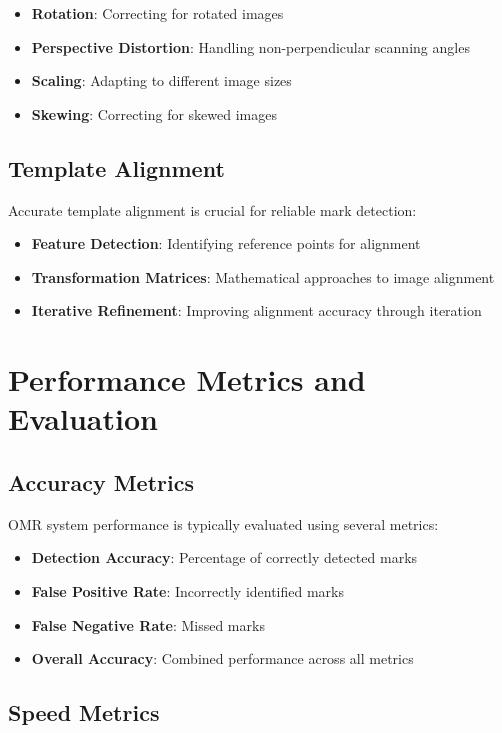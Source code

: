 \begin{itemize}
\item \textbf{Rotation}: Correcting for rotated images
\item \textbf{Perspective Distortion}: Handling non-perpendicular scanning angles
\item \textbf{Scaling}: Adapting to different image sizes
\item \textbf{Skewing}: Correcting for skewed images
\end{itemize}

\subsection{Template Alignment}

Accurate template alignment is crucial for reliable mark detection:

\begin{itemize}
\item \textbf{Feature Detection}: Identifying reference points for alignment
\item \textbf{Transformation Matrices}: Mathematical approaches to image alignment
\item \textbf{Iterative Refinement}: Improving alignment accuracy through iteration
\end{itemize}

\section{Performance Metrics and Evaluation}

\subsection{Accuracy Metrics}

OMR system performance is typically evaluated using several metrics:

\begin{itemize}
\item \textbf{Detection Accuracy}: Percentage of correctly detected marks
\item \textbf{False Positive Rate}: Incorrectly identified marks
\item \textbf{False Negative Rate}: Missed marks
\item \textbf{Overall Accuracy}: Combined performance across all metrics
\end{itemize}

\subsection{Speed Metrics}

